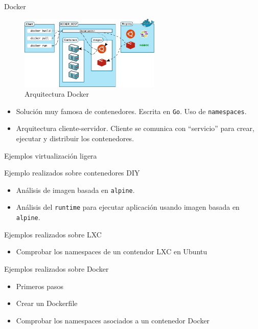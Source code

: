 \documentclass[aspectratio=169,xcolor=dvipsnames]{beamer}
\begin{document}
	\begin{frame}{Docker}
	    \begin{figure}[h]
        \includegraphics[width=0.6\textwidth]{img/architecture-docker.png}
        \caption{Arquitectura Docker}
        \end{figure}
	    
	    \begin{itemize}
	        \item Solución muy famosa de contenedores. Escrita en \texttt{Go}. Uso de \texttt{namespaces}.
	        \item Arquitectura cliente-servidor. Cliente se comunica con ``servicio'' para crear, ejecutar y distribuir los contenedores. 
	    \end{itemize}
	\end{frame}

    \begin{frame}{Ejemplos virtualización ligera}
        \begin{alertblock}{Ejemplo realizados sobre contenedores DIY}
            \begin{itemize}
                \item Análisis de imagen basada en \texttt{alpine}.
                \item Análisis del \texttt{runtime} para ejecutar aplicación usando imagen basada en \texttt{alpine}.
            \end{itemize}
        \end{alertblock}
        
        \begin{alertblock}{Ejemplos realizados sobre LXC}
	        \begin{itemize}
	            \item Comprobar los namespaces de un contendor LXC en Ubuntu
	        \end{itemize}
	    \end{alertblock}
    
         \begin{alertblock}{Ejemplos realizados sobre Docker}
	        \begin{itemize}
	            \item Primeros pasos
	            \item Crear un Dockerfile
	            \item Comprobar los namespaces asociados a un contenedor Docker
	        \end{itemize}
	    \end{alertblock}
    \end{frame}
    
\end{document}
